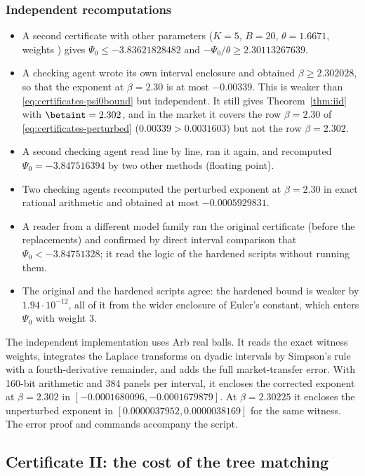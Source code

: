 \subsubsection*{Independent recomputations}
\begin{itemize}
\item A second certificate with other parameters ($K=5$, $B=20$, $\theta=1.6671$, weights
) gives $\Psi_0\le-3.83621828482$ and $-\Psi_0/\theta\ge2.30113267639$.
\item A checking agent wrote its own interval enclosure and obtained $\beta\ge2.302028$, so
that the exponent at $\beta=2.30$ is at most $-0.00339$. This is weaker than
\eqref{eq:certificates-psi0bound} but independent. It still gives Theorem~\ref{thm:iid} with
$\betaint=2.302$, and in the market it covers the row $\beta=2.30$ of
\eqref{eq:certificates-perturbed} ($0.00339>0.0031603$) but not the row $\beta=2.302$.
\item A second checking agent read  line by line, ran it again,
and recomputed $\Psi_0=-3.847516394$ by two other methods (floating point).
\item Two checking agents recomputed the perturbed exponent at $\beta=2.30$ in exact rational
arithmetic and obtained at most $-0.0005929831$.
\item A reader from a different model family ran the original certificate (before the
replacements) and confirmed by direct interval comparison that $\Psi_0<-3.84751328$; it read
the logic of the hardened scripts without running them.
\item The original and the hardened scripts agree: the hardened bound is weaker by
$1.94\cdot10^{-12}$, all of it from the wider enclosure of Euler's constant, which enters
$\Psi_0$ with weight $3$.
\end{itemize}
The independent implementation  uses
Arb real balls. It reads the exact witness weights, integrates the Laplace transforms
on dyadic intervals by Simpson's rule with a fourth-derivative remainder, and adds
the full market-transfer error. With 160-bit arithmetic and 384 panels per interval,
it encloses the corrected exponent at $\beta=2.302$ in
$[-0.0001680096,-0.0001679879]$. At $\beta=2.30225$ it encloses the
unperturbed exponent in $[0.0000037952,0.0000038169]$ for the same witness.
The error proof and commands accompany the script.

\subsection{Certificate II: the cost of the tree matching}\label{sec:certificates-II}

